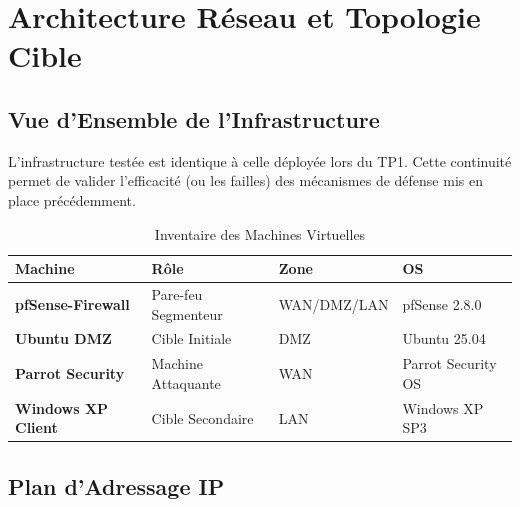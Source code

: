 \documentclass[12pt,a4paper,openany]{report}
\newcommand{\tableheadcolor}{\rowcolor{tableheadbg}}
\begin{document}
	\chapter{Architecture Réseau et Topologie Cible}
	
	\section{Vue d'Ensemble de l'Infrastructure}
	
	L'infrastructure testée est identique à celle déployée lors du TP1. Cette continuité permet de valider l'efficacité (ou les failles) des mécanismes de défense mis en place précédemment.
	
	\begin{table}[ht]
		\centering
		\renewcommand{\arraystretch}{1.4}
		\setlength{\arrayrulewidth}{0.5pt}
		\begin{tabular}{>{\bfseries}p{3.5cm} p{3.2cm} p{2.8cm} p{3.2cm}}
			\arrayrulecolor{tableborder}
			\hline
			\tableheadcolor
			\textcolor{tableheadfg}{\textbf{Machine}} &
			\textcolor{tableheadfg}{\textbf{Rôle}} &
			\textcolor{tableheadfg}{\textbf{Zone}} &
			\textcolor{tableheadfg}{\textbf{OS}} \\
			\hline
			\rowcolor{tablerowalt}
			pfSense-Firewall & Pare-feu Segmenteur & WAN/DMZ/LAN & pfSense 2.8.0 \\
			Ubuntu DMZ & Cible Initiale & DMZ & Ubuntu 25.04 \\
			\rowcolor{tablerowalt}
			Parrot Security & Machine Attaquante & WAN & Parrot Security OS \\
			Windows XP Client & Cible Secondaire & LAN & Windows XP SP3 \\
			\hline
		\end{tabular}
		\caption{Inventaire des Machines Virtuelles}
		\label{tab:vm-inventory-tp3}
	\end{table}
	
	\section{Plan d'Adressage IP}
	
\end{document}
